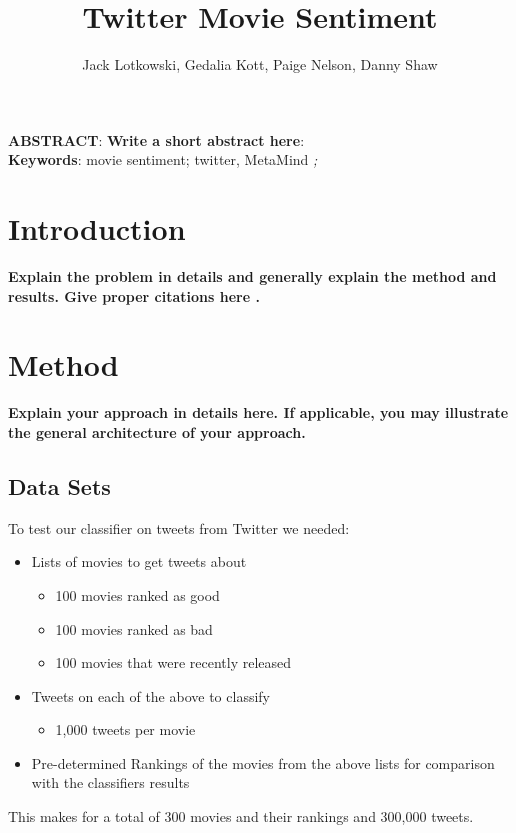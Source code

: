 \documentclass[12pt]{article}
\begin{document}
\title{Twitter Movie Sentiment}

\author{Jack Lotkowski, Gedalia Kott, Paige Nelson, Danny Shaw}

\maketitle


\noindent \textbf{ABSTRACT}: \textbf{Write a short abstract here}: \lipsum[1-1]
~\\ 
\textbf{Keywords}: movie sentiment; twitter, MetaMind \textit{;}

\section{Introduction}\label{S:1}
\textbf{Explain the problem in details and generally explain the method and results. Give proper citations here \cite{Smith:2013jd}	.} \lipsum[1-6]
\section{Method}\label{S:2}
\textbf{Explain your approach in details here. If applicable, you may illustrate the general architecture of your approach.}
\subsection{Data Sets}\label{S:3}
To test our classifier on tweets from Twitter we needed: 
\begin{itemize}
  \item Lists of movies to get tweets about
  	\begin{itemize}
  		\item 100 movies ranked as good
  		\item 100 movies ranked as bad
  		\item 100 movies that were recently released
  	\end{itemize}
  \item Tweets on each of the above  to classify
  	\begin{itemize}
  		\item 1,000 tweets per movie
  	\end{itemize}
  \item Pre-determined Rankings of the movies from the above lists for comparison with the classifiers results
\end{itemize}
This makes for a total of 300 movies and their rankings and 300,000 tweets.
\end{document}
